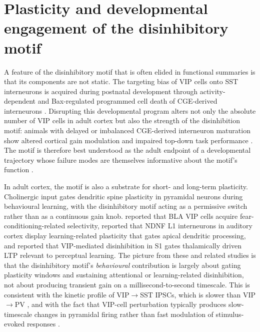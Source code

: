 \documentclass[11pt]{article}
\let\origrightarrow\rightarrow
\def\rightarrow{\ensuremath{\origrightarrow}}
\begin{document}
\section{Plasticity and developmental engagement of the disinhibitory motif}

A feature of the disinhibitory motif that is often elided in functional summaries is that its components are not static. The targeting bias of VIP cells onto SST interneurons is acquired during postnatal development through activity-dependent and Bax-regulated programmed cell death of CGE-derived interneurons \citep{Wu2022}. Disrupting this developmental program alters not only the absolute number of VIP cells in adult cortex \citep{Priya2018} but also the strength of the disinhibition motif: animals with delayed or imbalanced CGE-derived interneuron maturation show altered cortical gain modulation and impaired top-down task performance \citep{Batistabrito2017, Ferguson2023a, Ferguson2023b, Vanvelze2024}. The motif is therefore best understood as the adult endpoint of a developmental trajectory whose failure modes are themselves informative about the motif's function \citep{Takesian2018, Malik2022, Furutachi2024}.

In adult cortex, the motif is also a substrate for short- and long-term plasticity. Cholinergic input gates dendritic spine plasticity in pyramidal neurons during behavioural learning, with the disinhibitory motif acting as a permissive switch rather than as a continuous gain knob. \citet{Krabbe2019} reported that BLA VIP cells acquire fear-conditioning-related selectivity, \citet{Abs2018} reported that NDNF L1 interneurons in auditory cortex display learning-related plasticity that gates apical dendritic processing, and \citet{Williams2019} reported that VIP-mediated disinhibition in S1 gates thalamically driven LTP relevant to perceptual learning. The picture from these and related studies \citep{Tamboli2024, Ramosprats2022, Mcfarlan2024a, Mcfarlan2024b} is that the disinhibitory motif's \textit{behavioural} contribution is largely about gating plasticity windows and sustaining attentional or learning-related disinhibition, not about producing transient gain on a millisecond-to-second timescale. This is consistent with the kinetic profile of VIP\rightarrow SST IPSCs, which is slower than VIP\rightarrow PV \citep{Pi2013}, and with the fact that VIP-cell perturbation typically produces slow-timescale changes in pyramidal firing rather than fast modulation of stimulus-evoked responses \citep{Lee2013, Kuchibhotla2017, Pinto2015}.
\end{document}
